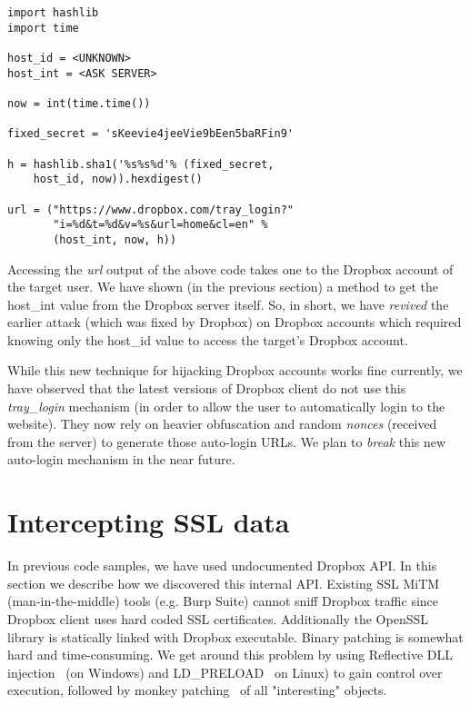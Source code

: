 \documentclass[letterpaper,twocolumn,10pt]{article}
\begin{document}
\begin{verbatim}
import hashlib
import time

host_id = <UNKNOWN>
host_int = <ASK SERVER>

now = int(time.time())

fixed_secret = 'sKeevie4jeeVie9bEen5baRFin9'

h = hashlib.sha1('%s%s%d'% (fixed_secret,
    host_id, now)).hexdigest()

url = ("https://www.dropbox.com/tray_login?"
       "i=%d&t=%d&v=%s&url=home&cl=en" %
       (host_int, now, h))

\end{verbatim}

Accessing the \emph{url} output of the above code takes one to the Dropbox
account of the target user. We have shown (in the previous section) a method to
get the host\_int value from the Dropbox server itself. So, in short, we have
\emph{revived} the earlier attack (which was fixed by Dropbox) on Dropbox
accounts which required knowing only the host\_id value to access the target's
Dropbox account.

While this new technique for hijacking Dropbox accounts works fine currently,
we have observed that the latest versions of Dropbox client do not use this
\emph{tray\_login} mechanism (in order to allow the user to automatically login
to the website). They now rely on heavier obfuscation and random \emph{nonces}
(received from the server) to generate those auto-login URLs. We plan to
\emph{break} this new auto-login mechanism in the near future.

\section{Intercepting SSL data}
\label{sec:internals}
In previous code samples, we have used undocumented Dropbox API. In this
section we describe how we discovered this internal API. Existing SSL MiTM
(man-in-the-middle) tools (e.g. Burp Suite) cannot sniff Dropbox traffic since
Dropbox client uses hard coded SSL certificates. Additionally the OpenSSL
library is statically linked with Dropbox executable. Binary patching is
somewhat hard and time-consuming. We get around this problem by using
Reflective DLL injection~\cite{fewer2008reflective} (on Windows) and
LD\_PRELOAD~\cite{LDPRELOAD} on Linux) to gain control over execution, followed
by monkey patching~\cite{monkey} of all "interesting" objects.
\end{document}
